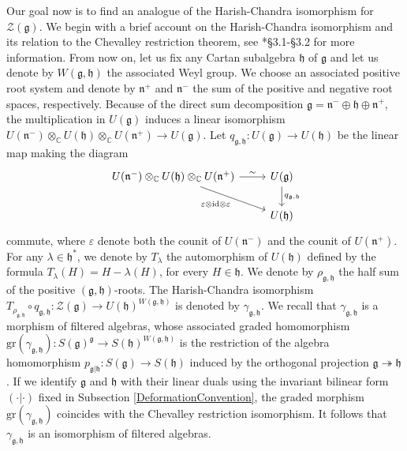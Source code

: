 \documentclass{amsart}
\theoremstyle{definition}
\begin{document}
Our goal now is to find an analogue of the Harish-Chandra isomorphism for~$\mathcal{Z}(\bm{\mathfrak{g}})$. We begin with a brief account on the Harish-Chandra isomorphism and its relation to the Chevalley restriction theorem, see \cite{Wallach}*{§3.1-§3.2} for more information.
From now on, let us fix any Cartan subalgebra $\mathfrak{h}$ of $\mathfrak{g}$ and let us denote by $W(\mathfrak{g},\mathfrak{h})$ the associated Weyl group. We choose an associated positive root system and denote by $\mathfrak{n}^+$ and $\mathfrak{n}^-$ the sum of the positive and negative root spaces, respectively. Because of the direct sum decomposition $\mathfrak{g} = \mathfrak{n}^- \oplus \mathfrak{h} \oplus \mathfrak{n}^+$, the multiplication in $U(\mathfrak{g})$ induces a linear isomorphism $U(\mathfrak{n}^-) \otimes_\mathbb{C} U(\mathfrak{h}) \otimes_\mathbb{C} U(\mathfrak{n}^+) \to U(\mathfrak{g})$. Let $q_{\mathfrak{g}, \mathfrak{h}} : U(\mathfrak{g}) \to U(\mathfrak{h})$ be the linear map making the diagram
\[
\begin{tikzcd}
     U(\mathfrak{n}^-) \otimes_\mathbb{C} U(\mathfrak{h}) \otimes_\mathbb{C} U(\mathfrak{n}^+) \ar[r, "\sim"] \ar[dr, "\varepsilon \otimes \mathrm{id} \otimes \varepsilon"']& U(\mathfrak{g}) \ar[d, "q_{\mathfrak{g}, \mathfrak{h}}"] \\
    & U(\mathfrak{h}) 
\end{tikzcd}
\]
commute, where $\varepsilon$ denote both the counit of $U(\mathfrak{n}^-)$ and the counit of $U(\mathfrak{n}^+)$. For any $\lambda \in \mathfrak{h}^*$, we denote by $T_\lambda$ the automorphism of $U(\mathfrak{h})$ defined by the formula $T_\lambda(H) = H - \lambda(H)$, for every $H \in \mathfrak{h}$. We denote by $\rho_{\mathfrak{g},\mathfrak{h}}$ the half sum of the positive $(\mathfrak{g},\mathfrak{h})$-roots. The Harish-Chandra isomorphism $T_{\rho_{\mathfrak{g},\mathfrak{h}}} \circ q_{\mathfrak{g},\mathfrak{h}} : \mathcal{Z}(\mathfrak{g}) \to U(\mathfrak{h})^{W(\mathfrak{g},\mathfrak{h})}$ is denoted by $\gamma_{\mathfrak{g},\mathfrak{h}}$. We recall that $\gamma_{\mathfrak{g},\mathfrak{h}}$ is a morphism of filtered algebras, whose associated graded homomorphism $\mathrm{gr}(\gamma_{\mathfrak{g},\mathfrak{h}}) : S(\mathfrak{g})^\mathfrak{g} \to S(\mathfrak{h})^{W(\mathfrak{g},\mathfrak{h})}$ is the restriction of the algebra homomorphism $p_{\mathfrak{g}|\mathfrak{h}} : S(\mathfrak{g}) \to S(\mathfrak{h})$ induced by the orthogonal projection $\mathfrak{g} \twoheadrightarrow \mathfrak{h}$. If we identify $\mathfrak{g}$ and $\mathfrak{h}$ with their linear duals using the invariant bilinear form $(\cdot |\cdot )$ fixed in Subsection \ref{DeformationConvention}, the graded morphism $\mathrm{gr}(\gamma_{\mathfrak{g},\mathfrak{h}})$ coincides with the Chevalley restriction isomorphism. It follows that $\gamma_{\mathfrak{g},\mathfrak{h}}$ is an isomorphism of filtered algebras.
\end{document}
